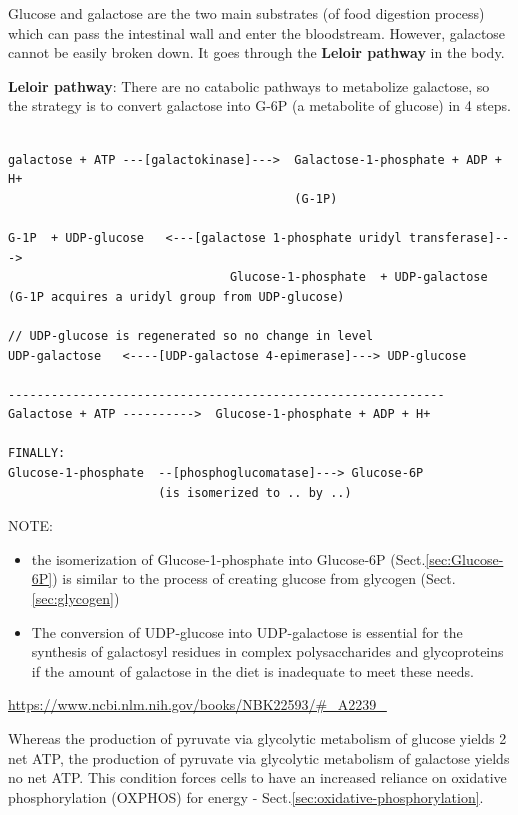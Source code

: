 Glucose and galactose are the two main substrates
(of food digestion process) which can pass the intestinal wall and enter the
bloodstream. However, galactose cannot be easily broken down. It goes through
the {\bf Leloir pathway} in the body.

{\bf Leloir pathway}: There are no catabolic pathways to metabolize galactose,
so the strategy is to convert galactose into G-6P (a metabolite of glucose) in 4 steps.

{\tiny
\begin{verbatim}

galactose + ATP ---[galactokinase]--->  Galactose-1-phosphate + ADP + H+
                                        (G-1P)
                                        
G-1P  + UDP-glucose   <---[galactose 1-phosphate uridyl transferase]---> 
                               Glucose-1-phosphate  + UDP-galactose
(G-1P acquires a uridyl group from UDP-glucose) 

// UDP-glucose is regenerated so no change in level
UDP-galactose   <----[UDP-galactose 4-epimerase]---> UDP-glucose

-------------------------------------------------------------
Galactose + ATP ---------->  Glucose-1-phosphate + ADP + H+

FINALLY:
Glucose-1-phosphate  --[phosphoglucomatase]---> Glucose-6P
                     (is isomerized to .. by ..)
\end{verbatim}
}

NOTE:
\begin{itemize}
  \item the isomerization of Glucose-1-phosphate into Glucose-6P
  (Sect.\ref{sec:Glucose-6P}) is similar to the process of creating glucose
  from glycogen (Sect.\ref{sec:glycogen})
  
  \item The conversion of UDP-glucose into UDP-galactose is essential for the
  synthesis of galactosyl residues in complex polysaccharides and glycoproteins
  if the amount of galactose in the diet is inadequate to meet these needs.
  
\end{itemize}
\url{https://www.ncbi.nlm.nih.gov/books/NBK22593/#_A2239_}


Whereas the production of pyruvate via glycolytic metabolism of glucose yields 2
net ATP, the production of pyruvate via glycolytic metabolism of galactose
yields no net ATP. This condition forces cells to have an increased reliance
on oxidative phosphorylation (OXPHOS) for energy -
Sect.\ref{sec:oxidative-phosphorylation}.


